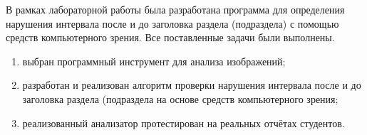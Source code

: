 
В рамках лабораторной работы была разработана программа для определения нарушения интервала после и до заголовка раздела (подраздела) с помощью средств компьютерного зрения. Все поставленные задачи были выполнены.

\begin{enumerate}[label*=\arabic*)]
	\item выбран программный инструмент для анализа изображений;
	\item разработан и реализован алгоритм проверки нарушения интервала после и до заголовка раздела (подраздела на основе средств компьютерного зрения;
	\item реализованный анализатор протестирован на реальных отчётах студентов.
\end{enumerate}
